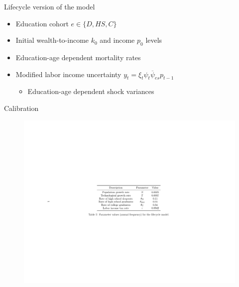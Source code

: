 \documentclass{beamer}
\begin{document}

\begin{frame}{Lifecycle version of the model}
\begin{itemize}
\item Education cohort $e \in \{D, HS, C\}$
\item Initial wealth-to-income $k_0$ and income $p_0$ levels
\item Education-age dependent mortality rates
\par \parencite{Brown2007}
\item Modified labor income uncertainty $y_t = \xi_t \psi_t \overline{\psi}_{es} p_{t-1}$
\par \parencite{Cagetti2003}
\begin{itemize}
\item Education-age dependent shock variances
\par \parencite{Sabelhaus2010}
\end{itemize}
\end{itemize}
\end{frame}

\begin{frame}{Calibration}
  \vfill
   \begin{figure}
    \centering
    \includegraphics[width=.85\linewidth, scale=1.5]{Tables/calibrationLC.pdf}
  \end{figure}
  \vfill
\end{frame}
\end{document}
